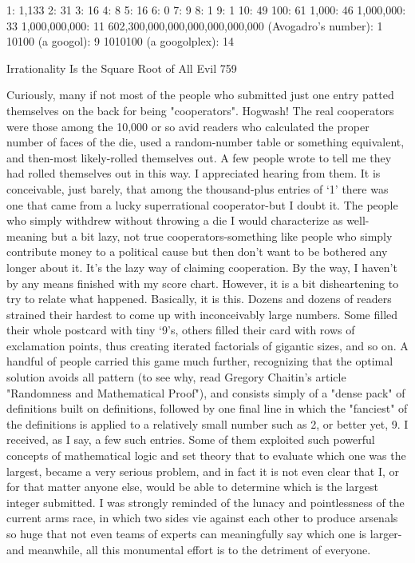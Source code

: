        1: 1,133
       2: 31
       3: 16
       4: 8
       5: 16
       6: 0
       7: 9
       8: 1
       9: 1
       10: 49
       100: 61
       1,000: 46
       1,000,000: 33
       1,000,000,000:      11
       602,300,000,000,000,000,000,000 (Avogadro's number): 1
       10100 (a googol): 9
       1010100 (a googolplex): 14




Irrationality Is the Square Root of All Evil                                          759

         Curiously, many if not most of the people who submitted just one entry patted
themselves on the back for being "cooperators". Hogwash! The real cooperators were
those among the 10,000 or so avid readers who calculated the proper number of faces
of the die, used a random-number table or something equivalent, and then-most
likely-rolled themselves out. A few people wrote to tell me they had rolled themselves
out in this way. I appreciated hearing from them. It is conceivable, just barely, that
among the thousand-plus entries of `1' there was one that came from a lucky
superrational cooperator-but I doubt it. The people who simply withdrew without
throwing a die I would characterize as well-meaning but a bit lazy, not true
cooperators-something like people who simply contribute money to a political cause
but then don't want to be bothered any longer about it. It's the lazy way of claiming
cooperation.
         By the way, I haven't by any means finished with my score chart. However, it
is a bit disheartening to try to relate what happened. Basically, it is this. Dozens and
dozens of readers strained their hardest to come up with inconceivably large numbers.
Some filled their whole postcard with tiny `9's, others filled their card with rows of
exclamation points, thus creating iterated factorials of gigantic sizes, and so on. A
handful of people carried this game much further, recognizing that the optimal
solution avoids all pattern (to see why, read Gregory Chaitin's article "Randomness
and Mathematical Proof"), and consists simply of a "dense pack" of definitions built
on definitions, followed by one final line in which the "fanciest" of the definitions is
applied to a relatively small number such as 2, or better yet, 9.
         I received, as I say, a few such entries. Some of them exploited such powerful
concepts of mathematical logic and set theory that to evaluate which one was the
largest, became a very serious problem, and in fact it is not even clear that I, or for
that matter anyone else, would be able to determine which is the largest integer
submitted. I was strongly reminded of the lunacy and pointlessness of the current
arms race, in which two sides vie against each other to produce arsenals so huge that
not even teams of experts can meaningfully say which one is larger-and meanwhile,
all this monumental effort is to the detriment of everyone.

